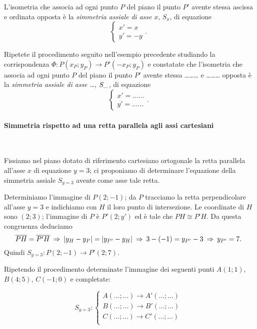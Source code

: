 L'isometria che associa ad ogni punto $P$ del piano il punto $P'$ avente stessa ascissa e ordinata opposta è la \emph{simmetria assiale di asse $x$}, $S_x$, di equazione
\[\begin{cases}x'=x\\ y'=-y\end{cases}.\]
 
Ripetete il procedimento seguito nell'esempio precedente studiando la corrispondenza $\Phi:P(x_P;y_P) \rightarrow P'(-x_P;y_P)$ e constatate che l'isometria che associa ad ogni punto $P$ del piano il punto $P'$ avente stessa \ldots\ldots\ldots{} e \ldots\ldots\ldots{} opposta è la \emph{simmetria assiale di asse \ldots{}}, $S_{\vphantom{k}\ldots{}}$, di equazione
\[\begin{cases}x'=\ldots\ldots{}\\ y'=\ldots\ldots{}\end{cases}.\]

\paragraph{Simmetria rispetto ad una retta parallela agli assi cartesiani}
~

\begin{exrig}
\begin{esempio}
Fissiamo nel piano dotato di riferimento cartesiano ortogonale la retta parallela all'asse $x$ di equazione $y=3$; ci proponiamo di determinare l'equazione della simmetria assiale $S_{y=3}$ avente come asse tale retta.\vspace{7pt}

\begin{figure*}[!htb]
	\centering
\end{figure*}

Determiniamo l'immagine di $P(2;-1)$; da $P$ tracciamo la retta perpendicolare all'asse $y=3$ e indichiamo con $H$ il loro punto di intersezione. Le coordinate di $H$ sono $(2;3)$; l'immagine di $P$ è $P'(2;y')$ ed è tale che $PH\cong P’H$. Da questa congruenza deduciamo
\[\overline{PH}=\overline{P'H}\:\Rightarrow\:\valass{y_H-y_P} = \valass{ y_{P'}-y_H} \:\Rightarrow\: 3-(-1)=y_{P'}-3 \:\Rightarrow\: y_{P'}=7.\]
Quindi $S_{y=3}:P(2;-1)\rightarrow P'(2;7)$.

Ripetendo il procedimento determinate l'immagine dei seguenti punti $A(1;1)$, $B(4;5)$, $C(-1;0)$ e completate:

\[S_{y=3}:\begin{cases}A(\ldots{};\ldots{}) \rightarrow A'(\ldots{};\ldots{})\\
B(\ldots{};\ldots{}) \rightarrow B'(\ldots{};\ldots{})\\
C(\ldots{};\ldots{}) \rightarrow C'(\ldots{};\ldots{})\\
 \end{cases}\]
\end{esempio}
\end{exrig}

